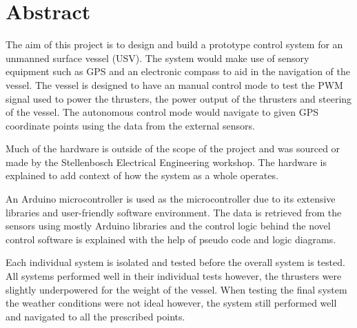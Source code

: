 \chapter{Abstract}
The aim of this project is to design and build a prototype control system for an unmanned surface vessel (USV). The system would make use of sensory equipment such as GPS and an electronic compass to aid in the navigation of the vessel. The vessel is designed to have an manual control mode to test the PWM signal used to power the thrusters, the power output of the thrusters and steering of the vessel. The autonomous control mode would navigate to given GPS coordinate points using the data from the external sensors. \par
Much of the hardware is outside of the scope of the project and was sourced or made by the Stellenbosch Electrical Engineering workshop. The hardware is explained to add context of how the system as a whole operates.\par
An Arduino microcontroller is used as the microcontroller due to its extensive libraries and user-friendly software environment. The data is retrieved from the sensors using mostly Arduino libraries and the control logic behind the novel control software is explained with the help of pseudo code and logic diagrams.\par
Each individual system is isolated and tested before the overall system is tested. All systems performed well in their individual tests however, the thrusters were slightly underpowered for the weight of the vessel. When testing the final system the weather conditions were not ideal however, the system still performed well and navigated to all the prescribed points.

